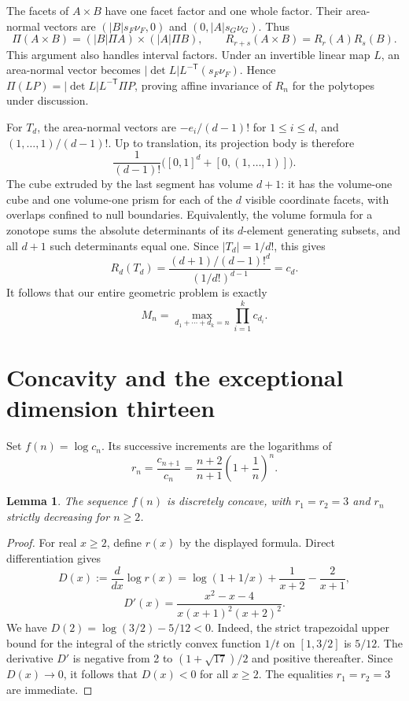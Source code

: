 \documentclass[11pt]{article}
\newtheorem{lemma}[theorem]{Lemma}
\theoremstyle{remark}\newtheorem{remark}[theorem]{Remark}
\begin{document}
The facets of $A\times B$ have one facet factor and one whole factor. Their area-normal vectors are $(|B|s_F\nu_F,0)$ and $(0,|A|s_G\nu_G)$. Thus
\[
 \Pi(A\times B)=(|B|\Pi A)\times(|A|\Pi B),
 \qquad R_{r+s}(A\times B)=R_r(A)R_s(B).
\]
This argument also handles interval factors. Under an invertible linear map $L$, an area-normal vector becomes $|\det L|L^{-\mathsf T}(s_F\nu_F)$. Hence $\Pi(LP)=|\det L|L^{-\mathsf T}\Pi P$, proving affine invariance of $R_n$ for the polytopes under discussion.

For $T_d$, the area-normal vectors are $-e_i/(d-1)!$ for $1\le i\le d$, and $(1,\ldots,1)/(d-1)!$. Up to translation, its projection body is therefore
\[
 \frac1{(d-1)!}\bigl([0,1]^d+[0,(1,\ldots,1)]\bigr).
\]
The cube extruded by the last segment has volume $d+1$: it has the volume-one cube and one volume-one prism for each of the $d$ visible coordinate facets, with overlaps confined to null boundaries. Equivalently, the volume formula for a zonotope sums the absolute determinants of its $d$-element generating subsets, and all $d+1$ such determinants equal one. Since $|T_d|=1/d!$, this gives
\[
 R_d(T_d)=\frac{(d+1)/(d-1)!^d}{(1/d!)^{d-1}}=c_d.
\]
It follows that our entire geometric problem is exactly
\begin{equation}\label{eq:partition}
 M_n=\max_{d_1+\cdots+d_k=n}\prod_{i=1}^k c_{d_i}.
\end{equation}

\section{Concavity and the exceptional dimension thirteen}
Set $f(n)=\log c_n$. Its successive increments are the logarithms of
\[
 r_n=\frac{c_{n+1}}{c_n}=\frac{n+2}{n+1}\left(1+\frac1n\right)^n.
\]

\begin{lemma}\label{lem:concavity}
The sequence $f(n)$ is discretely concave, with $r_1=r_2=3$ and $r_n$ strictly decreasing for $n\ge2$.
\end{lemma}
\begin{proof}
For real $x\ge2$, define $r(x)$ by the displayed formula. Direct differentiation gives
\[
 D(x):=\frac{d}{dx}\log r(x)
 =\log(1+1/x)+\frac1{x+2}-\frac2{x+1},
\]
\[
 D'(x)=\frac{x^2-x-4}{x(x+1)^2(x+2)^2}.
\]
We have $D(2)=\log(3/2)-5/12<0$. Indeed, the strict trapezoidal upper bound for the integral of the strictly convex function $1/t$ on $[1,3/2]$ is $5/12$. The derivative $D'$ is negative from 2 to $(1+\sqrt{17})/2$ and positive thereafter. Since $D(x)\to0$, it follows that $D(x)<0$ for all $x\ge2$. The equalities $r_1=r_2=3$ are immediate.
\end{proof}
\end{document}
